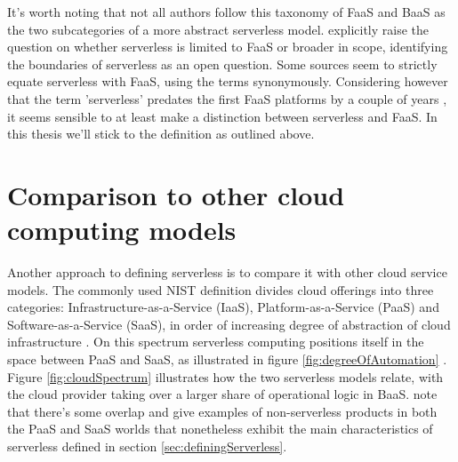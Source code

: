 \documentclass[utf8,english]{gradu3}
\begin{document}
It's worth noting that not all authors follow this taxonomy of FaaS and BaaS as the two subcategories of a more abstract serverless model. \textcite{baldini17currentTrends} explicitly raise the question on whether serverless is limited to FaaS or broader in scope, identifying the boundaries of serverless as an open question. Some sources \parencite[][among others]{hendrickson16openlambda,mcgrath17implement,varghese18next} seem to strictly equate serverless with FaaS, using the terms synonymously. Considering however that the term 'serverless' predates the first FaaS platforms by a couple of years \parencite{robert2016serverlessarchitectures}, it seems sensible to at least make a distinction between serverless and FaaS. In this thesis we'll stick to the \textcite{cncf18serverlessWG} definition as outlined above.

\section{Comparison to other cloud computing models}


Another approach to defining serverless is to compare it with other cloud service models. The commonly used NIST definition divides cloud offerings into three categories: Infrastructure-as-a-Service (IaaS), Platform-as-a-Service (PaaS) and Software-as-a-Service (SaaS), in order of increasing degree of abstraction of cloud infrastructure \parencite{nist11definitions}. On this spectrum serverless computing positions itself in the space between PaaS and SaaS, as illustrated in figure \ref{fig:degreeOfAutomation} \parencite{baldini17currentTrends}. Figure \ref{fig:cloudSpectrum} illustrates how the two serverless models relate, with the cloud provider taking over a larger share of operational logic in BaaS. \textcite{van2017spec} note that there's some overlap and give examples of non-serverless products in both the PaaS and SaaS worlds that nonetheless exhibit the main characteristics of serverless defined in section \ref{sec:definingServerless}.
\end{document}
